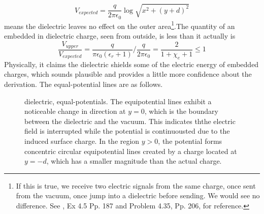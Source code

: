 \[
V_{expected}=\frac{q}{2\pi\epsilon_0}\log\sqrt{x^2+(y+d)^2}
\]
means the dielectric leaves no effect on the outer area\footnote{If this is true, we receive two electric signals from the same charge, once sent from the vacuum, once jump into a dielectric before sending. We would see no difference. See \cite{Griffiths_2017}, Ex 4.5 Pp. 187 and Problem 4.35, Pp. 206, for reference.}.The quantity of an embedded in dielectric charge, seen from outside, is less than it actually is
\[
\frac{V_{upper}}{V_{expected}}=\frac{q}{\pi\epsilon_0(\epsilon_r+1)} / \frac{q}{2\pi\epsilon_0}=\frac{2}{1+\chi_e+1}\leq 1
\]
Physically, it claims the dielectric shields some of the electric energy of embedded charges, which sounds plausible and provides a little more confidence about the derivation.
The equal-potential lines are as follows.
\begin{figure}[H]
    \centering
    \caption{\small dielectric, equal-potentials. The equipotential lines exhibit a noticeable change in direction at \( y=0 \), which is the boundary between the dielectric and the vacuum. This indicates ththe electric field is interrupted while the potential is continuousted due to the induced surface charge. In the region \( y>0 \), the potential forms concentric circular equipotential lines created by a charge located at \( y=-d \), which has a smaller magnitude than the actual charge.
 }
    \label{fig:enter-label}
\end{figure}


